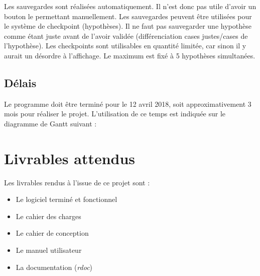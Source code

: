 \documentclass{report}
\begin{document}
		Les sauvegardes sont réalisées automatiquement. Il n'est donc pas utile d'avoir un bouton le permettant manuellement. Les sauvegardes peuvent être utilisées pour le système de checkpoint (hypothèses). Il ne faut pas sauvegarder une hypothèse comme étant juste avant de l'avoir validée (différenciation cases justes/cases de l'hypothèse). Les checkpoints sont utilisables en quantité limitée, car sinon il y aurait un désordre à l'affichage. Le maximum est fixé à 5 hypothèses simultanées.
	
	\section{Délais}
		Le programme doit être terminé pour le 12 avril 2018, soit approximativement 3 mois pour réaliser le projet. L'utilisation de ce temps est indiquée sur le diagramme de Gantt suivant :
		
		
		
\chapter{Livrables attendus}
	Les livrables rendus à l'issue de ce projet sont :
	\begin{itemize}
	\item Le logiciel terminé et fonctionnel
	\item Le cahier des charges
	\item Le cahier de conception
	\item Le manuel utilisateur
	\item La documentation (\textit{rdoc})
	\end{itemize}
		
		
		
\end{document}
